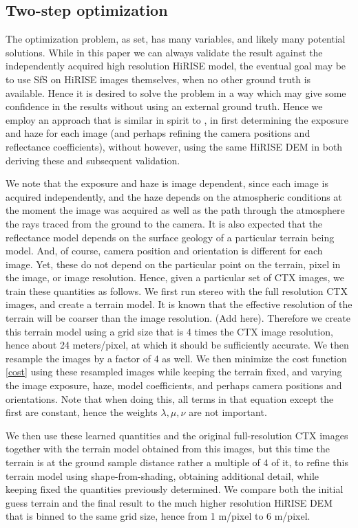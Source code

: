 \documentclass[draft,linenumbers]{agujournal}
\begin{document}
\subsection{Two-step optimization}
\label{twostep}
The optimization problem, as set, has many variables, and likely many potential solutions. While in this paper we can always validate the result against the independently acquired high resolution HiRISE model,
the eventual goal may be to use SfS on HiRISE images themselves, when no other ground truth is available. 
Hence it is desired to solve the problem in a way which may give some confidence in the results without
using an external ground truth. Hence we employ an approach that is similar in spirit to \citep{wohlfarth2018high}, in first determining the exposure and haze for each image (and perhaps refining the camera positions and reflectance coefficients), without however, using the same HiRISE DEM in both deriving these and subsequent validation. 

We note that the exposure and haze is image dependent, since each image is acquired independently, and the haze depends on the atmospheric conditions at the moment the image was acquired as well as
the path through the atmosphere the rays traced from the ground to the camera. It is also expected
that the reflectance model depends on the surface geology of a particular terrain being model. 
And, of course, camera position and orientation is different for each image. 
Yet, these do not depend on the particular point on the terrain, pixel in the image,
or image resolution. Hence, given a particular set of CTX images, we train these quantities as follows.
We first run stereo with the full resolution CTX images, and create a terrain model. It is known that
the effective resolution of the terrain will be coarser than the image resolution. (Add here). Therefore 
we create this terrain model using a grid size that is 4 times the CTX image resolution, hence 
about 24 meters/pixel, at which it should be sufficiently accurate. We then resample the images by a factor of 4 as well. We then minimize the cost function \ref{cost} using these resampled images while keeping the terrain fixed, and varying the image exposure, haze, model coefficients, and perhaps camera positions and orientations. Note that when doing this, all terms in that equation except the first are constant, hence the weights $\lambda, \mu, \nu$ are not important. 

We then use these learned quantities and the original full-resolution CTX images together with the terrain model obtained from this images, but this time the terrain is at the ground sample distance rather a multiple of 4 of it, to refine this terrain model using shape-from-shading, obtaining additional detail, while keeping fixed the quantities previously determined. We compare both the initial guess terrain and the final result to the much higher resolution HiRISE DEM that is binned to the same grid size, hence from 1 m/pixel to 6 m/pixel. 
\end{document}
